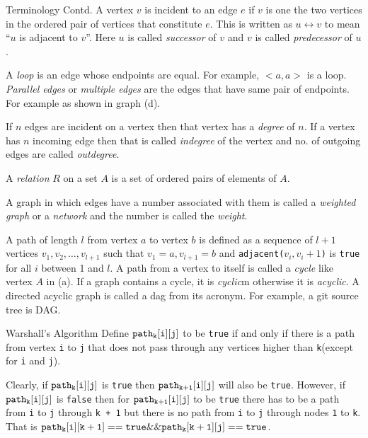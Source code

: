 \documentclass[aspectratio=169,8pt]{beamer}
\begin{document}
\begin{frame}{Terminology Contd.}
  A vertex $v$ is incident to an edge $e$ if $v$ is one the two vertices in the ordered pair of vertices that
  constitute $e$. This is written as $u\leftrightarrow v$ to mean ``$u$ is adjacent to $v$''. Here $u$ is called
  {\it successor} of $v$ and $v$ is called {\it predecessor} of $u$.

  A {\it loop} is an edge whose endpoints are equal. For example, $<a, a>$ is a loop. {\it Parallel edges} or {\it
    multiple edges} are the edges that have same pair of endpoints. For example as shown in graph (d).

  If $n$ edges are incident on a vertex then that vertex has a {\it degree} of $n$. If a vertex has $n$ incoming
  edge then that is called {\it indegree} of the vertex and no. of outgoing edges are called {\it outdegree}.

  A {\it relation} $R$ on a set $A$ is a set of ordered pairs of elements of $A$.

  A graph in which edges have a number associated with them is called a {\it weighted graph} or a {\it network}
  and the number is called the {\it weight}.

  A path of length $l$ from vertex $a$ to vertex $b$ is defined as a sequence of $l + 1$ vertices
  $v_1, v_2, \ldots, v_{l + 1}$ such that $v_1 = a, v_{l + 1} = b$ and {\tt adjacent($v_i, v_i + 1$)} is {\tt true}
  for all $i$ between 1 and $l$. A path from a vertex to itself is called a {\it cycle} like vertex $A$ in (a).
  If a graph contains a cycle, it is {\it cyclic}m otherwise it is {\it acyclic}. A directed acyclic graph is
  called a dag from its acronym. For example, a git source tree is DAG.
\end{frame}
\begin{frame}{Warshall's Algorithm}
  Define ${\tt path_k[i][j]}$ to be {\tt true} if and only if there is a path from vertex {\tt i} to {\tt j}
  that does not pass through any vertices higher than {\tt k}(except for {\tt i} and {\tt j}).

  Clearly, if ${\tt path_k[i][j]}$ is {\tt true} then ${\tt path_{k + 1}[i][j]}$ will also be {\tt true}.
  However, if ${\tt path_k[i][j]}$ is {\tt false} then for ${\tt path_{k + 1}[i][j]}$ to be {\tt true} there
  has to be a path from {\tt i} to {\tt j} through {\tt k + 1} but there is no path from {\tt i} to {\tt j}
  through nodes {\tt 1} to {\tt k}. That is ${\tt path_k[i][k + 1] == true \&\& path_k[k + 1][j] == true}$.
\end{frame}
\end{document}
